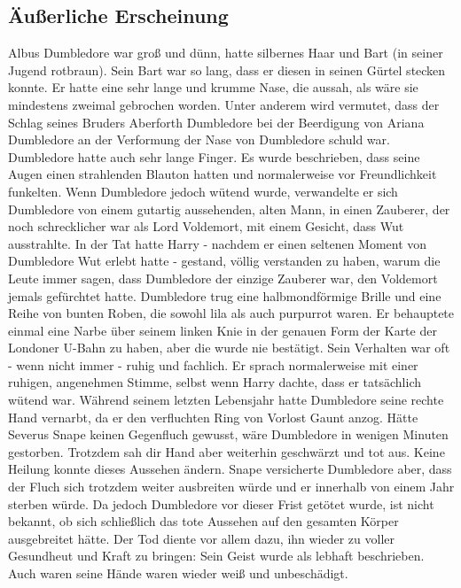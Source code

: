 \documentclass[a4paper, 10pt]{article}
\begin{document}
\subsection*{\Large Äußerliche Erscheinung}
Albus Dumbledore war groß und dünn, hatte silbernes Haar und Bart (in seiner Jugend rotbraun). Sein Bart war so lang, dass er diesen in seinen Gürtel stecken konnte. Er hatte eine sehr lange und krumme Nase, die aussah, als wäre sie mindestens zweimal gebrochen worden. Unter anderem wird vermutet, dass der Schlag seines Bruders Aberforth Dumbledore bei der Beerdigung von Ariana Dumbledore an der Verformung der Nase von Dumbledore schuld war. Dumbledore hatte auch sehr lange Finger. Es wurde beschrieben, dass seine Augen einen strahlenden Blauton hatten und normalerweise vor Freundlichkeit funkelten.
\vspace{10pt}
\newline
Wenn Dumbledore jedoch wütend wurde, verwandelte er sich Dumbledore von einem gutartig aussehenden, alten Mann, in einen Zauberer, der noch schrecklicher war als Lord Voldemort, mit einem Gesicht, dass Wut ausstrahlte. In der Tat hatte Harry - nachdem er einen seltenen Moment von Dumbledore Wut erlebt hatte - gestand, völlig verstanden zu haben, warum die Leute immer sagen, dass Dumbledore der einzige Zauberer war, den Voldemort jemals gefürchtet hatte.
\vspace{10pt}
\newline
Dumbledore trug eine halbmondförmige Brille und eine Reihe von bunten Roben, die sowohl lila als auch purpurrot waren. Er behauptete einmal eine Narbe über seinem linken Knie in der genauen Form der Karte der Londoner U-Bahn zu haben, aber die wurde nie bestätigt. Sein Verhalten war oft - wenn nicht immer - ruhig und fachlich. Er sprach normalerweise mit einer ruhigen, angenehmen Stimme, selbst wenn Harry dachte, dass er tatsächlich wütend war.
\vspace{10pt}
\newline
Während seinem letzten Lebensjahr hatte Dumbledore seine rechte Hand vernarbt, da er den verfluchten Ring von Vorlost Gaunt anzog. Hätte Severus Snape keinen Gegenfluch gewusst, wäre Dumbledore in wenigen Minuten gestorben. Trotzdem sah dir Hand aber weiterhin geschwärzt und tot aus. Keine Heilung konnte dieses Aussehen ändern. Snape versicherte Dumbledore aber, dass der Fluch sich trotzdem weiter ausbreiten würde und er innerhalb von einem Jahr sterben würde. Da jedoch Dumbledore vor dieser Frist getötet wurde, ist nicht bekannt, ob sich schließlich das tote Aussehen auf den gesamten Körper ausgebreitet hätte.
\vspace{10pt}
\newline
Der Tod diente vor allem dazu, ihn wieder zu voller Gesundheut und Kraft zu bringen: Sein Geist wurde als lebhaft beschrieben. Auch waren seine Hände waren wieder weiß und unbeschädigt.
\end{document}
